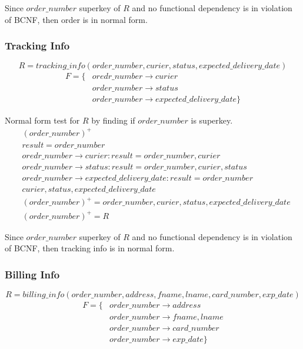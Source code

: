 \documentclass[fleqn]{scrreprt}
\begin{document}
Since $order\_number$ superkey of $R$ and no functional dependency is in violation
of BCNF, then order is in normal form.

\subsubsection{Tracking Info}
\begin{equation*}
    R = tracking\_info(order\_number, curier, status, expected\_delivery\_date)
\end{equation*}
\begin{align*}
    F = \{ & oredr\_number \rightarrow curier\\
           & order\_number \rightarrow status\\
           & order\_number \rightarrow expected\_delivery\_date \}
\end{align*}

Normal form test for $R$ by finding if $order\_number$ is superkey.
\begin{align*}
    & (order\_number)^+\\
    & result = order\_number\\
    & oredr\_number \rightarrow curier : result = order\_number, curier\\
    & oredr\_number \rightarrow status : result = order\_number, curier, status\\
    & oredr\_number \rightarrow expected\_delivery\_date : result = order\_number\\
    & curier, status, expected\_delivery\_date\\
    & (order\_number)^+ = order\_number, curier, status, expected\_delivery\_date\\
    & (order\_number)^+ = R
\end{align*}

Since $order\_number$ superkey of $R$ and no functional dependency is in violation
of BCNF, then tracking info is in normal form.

\subsubsection{Billing Info}
\begin{equation*}
    R = billing\_info(order\_number, address, fname, lname, card\_number, exp\_date)
\end{equation*}
\begin{align*}
    F = \{ & order\_number \rightarrow address\\
           & order\_number \rightarrow fname, lname\\
           & order\_number \rightarrow card\_number\\
           & order\_number \rightarrow exp\_date \}
\end{align*}
\end{document}
